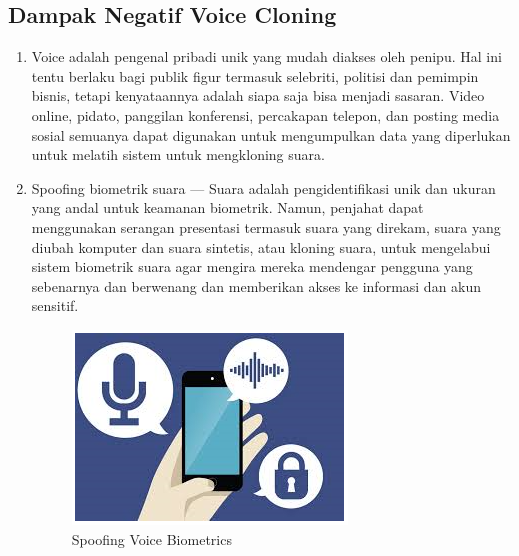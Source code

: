 \subsection{Dampak Negatif Voice Cloning}
\begin{enumerate}
\item Voice adalah pengenal pribadi unik yang mudah diakses oleh penipu. Hal ini tentu berlaku bagi publik figur termasuk selebriti, politisi dan pemimpin bisnis, tetapi kenyataannya adalah siapa saja bisa menjadi sasaran. Video online, pidato, panggilan konferensi, percakapan telepon, dan posting media sosial semuanya dapat digunakan untuk mengumpulkan data yang diperlukan untuk melatih sistem untuk mengkloning suara.

\item Spoofing biometrik suara — Suara adalah pengidentifikasi unik dan ukuran yang andal untuk keamanan biometrik. Namun, penjahat dapat menggunakan serangan presentasi termasuk suara yang direkam, suara yang diubah komputer dan suara sintetis, atau kloning suara, untuk mengelabui sistem biometrik suara agar mengira mereka mendengar pengguna yang sebenarnya dan berwenang dan memberikan akses ke informasi dan akun sensitif.
\begin{figure}[H]
        \centerline{\includegraphics[scale=1]{figures/spoof}}
        \caption{Spoofing Voice Biometrics}
		\label{spoof}
\end{figure}


\end{enumerate}
